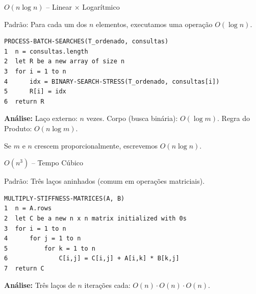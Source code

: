 \documentclass[aspectratio=169]{beamer}
\begin{document}
\begin{frame}{$O(n \log n)$ -- Linear $\times$ Logarítmico}
    \begin{block}{Padrão: Para cada um dos $n$ elementos, executamos uma operação $O(\log n)$.}
    \end{block}
\begin{verbatim}
PROCESS-BATCH-SEARCHES(T_ordenado, consultas)
1  n = consultas.length
2  let R be a new array of size n
3  for i = 1 to n
4      idx = BINARY-SEARCH-STRESS(T_ordenado, consultas[i])
5      R[i] = idx
6  return R
\end{verbatim}
    \textbf{Análise:} Laço externo: $n$ vezes. Corpo (busca binária): $O(\log m)$. Regra do Produto: $O(n \log m)$.

    Se $m$ e $n$ crescem proporcionalmente, escrevemos $O(n \log n)$.
    
    \vspace{0.1cm}
    \hfill{}
\end{frame}

\begin{frame}{$O(n^3)$ -- Tempo Cúbico}
    \begin{block}{Padrão: Três laços aninhados (comum em operações matriciais).}
    \end{block}
\begin{verbatim}
MULTIPLY-STIFFNESS-MATRICES(A, B)
1  n = A.rows
2  let C be a new n x n matrix initialized with 0s
3  for i = 1 to n
4      for j = 1 to n
5          for k = 1 to n
6              C[i,j] = C[i,j] + A[i,k] * B[k,j]
7  return C
\end{verbatim}
    \textbf{Análise:} Três laços de $n$ iterações cada: $O(n) \cdot O(n) \cdot O(n)$.
    
    \vspace{0.2cm}
    \hfill{}
\end{frame}
\end{document}
